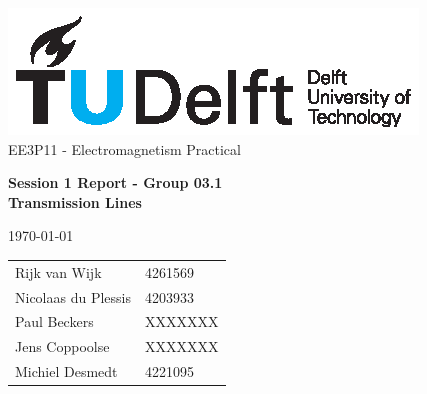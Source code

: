 \documentclass[11pt, a4paper, oneside]{article}
\begin{document}
\noindent
\begin{center}
	\includegraphics[width=\columnwidth]{tudelftlogo.eps} \\
	
	EE3P11 - Electromagnetism Practical\\
	\begin{LARGE}
		\textbf{Session 1 Report - Group 03.1 \\ Transmission Lines} \\[0.3cm]
	\end{LARGE}
	\today \\[.2cm]
	\begin{tabular}{l l}
		Rijk van Wijk & 4261569 \\
		Nicolaas du Plessis & 4203933 \\
		Paul Beckers & XXXXXXX \\
		Jens Coppoolse & XXXXXXX \\
		Michiel Desmedt & 4221095 \\
		
	\end{tabular}
\end{center}

	
	
	
	
\end{document}
